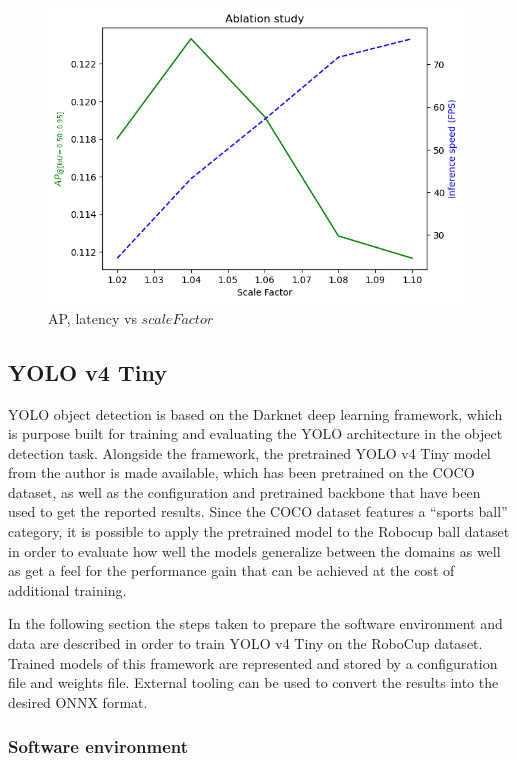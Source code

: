 \documentclass[a4paper,twoside,12pt]{report}
\begin{document}
\begin{figure}[h!]
\begin{center}
\includegraphics[width=11cm]{images/vj_ablation.png}
\caption{AP, latency vs $scaleFactor$}
\label{fig:vjspeeds}
\end{center}
\end{figure}

\subsection{YOLO v4 Tiny}

YOLO object detection is based on the Darknet deep learning framework, which is purpose built for training and evaluating the YOLO architecture in the object detection task. Alongside the framework, the pretrained YOLO v4 Tiny \citep{yolov4tiny} model from the author is made available, which has been pretrained on the COCO dataset, as well as the configuration and pretrained backbone that have been used to get the reported results. Since the COCO dataset features a ``sports ball'' category, it is possible to apply the pretrained model to the Robocup ball dataset in order to evaluate how well the models generalize between the domains as well as get a feel for the performance gain that can be achieved at the cost of additional training.

In the following section the steps taken to prepare the software environment and data are described in order to train YOLO v4 Tiny on the RoboCup dataset. Trained models of this framework are represented and stored by a configuration file and weights file. External tooling can be used to convert the results into the desired ONNX format. 

\subsubsection{Software environment}
\end{document}
